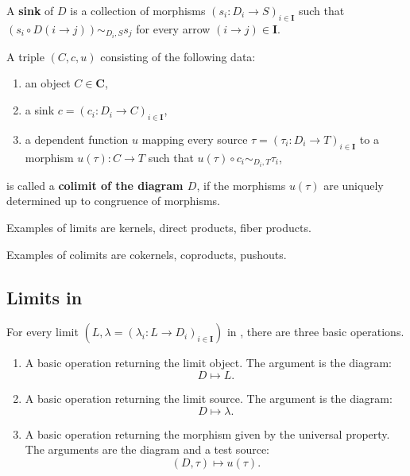 \begin{definition}
 A \textbf{sink} of $D$ is a collection of morphisms $( s_i: D_i \rightarrow S )_{i \in \mathbf{I}}$
 such that $\left(s_i \circ D( i \rightarrow j )\right) \sim_{D_i, S} s_j$ for every arrow $(i \rightarrow j) \in \mathbf{I}$.
\end{definition}


\begin{definition}
 A triple $(C, c, u)$ consisting of the following data:
 \begin{enumerate}
  \item an object $C \in \mathbf{C}$,
  \item a sink $c = ( c_i: D_i \rightarrow C )_{i \in \mathbf{I}}$,
  \item a dependent function $u$ mapping every source $\tau = ( \tau_i: D_i \rightarrow T )_{i \in \mathbf{I}}$
        to a morphism $u( \tau ): C \rightarrow T$ such that
        $u(\tau) \circ c_{i} \sim_{D_i,T} \tau_i$,
 \end{enumerate}
 is called a \textbf{colimit of the diagram $D$}, if the morphisms $u(\tau)$ are uniquely determined up to
 congruence of morphisms.
\end{definition}

\begin{example}
 Examples of limits are kernels, direct products, fiber products.
\end{example}

\begin{example}
 Examples of colimits are cokernels, coproducts, pushouts.
\end{example}

\subsection{Limits in \CapPkg}

For every limit $\left(L, \lambda = ( \lambda_i: L \rightarrow D_i)_{i \in \mathbf{I}} \right)$ in \CapPkg, 
there are three basic operations.

\begin{enumerate}
 \item A basic operation returning the limit object. The argument is the diagram:
 \[
  D \mapsto L.
 \]
 \item A basic operation returning the limit source. The argument is the diagram:
 \[
  D \mapsto \lambda.
 \]
 \item A basic operation returning the morphism given by the universal property. 
       The arguments are the diagram and a test source:
 \[
  ( D, \tau ) \mapsto u(\tau).
 \]
\end{enumerate}

